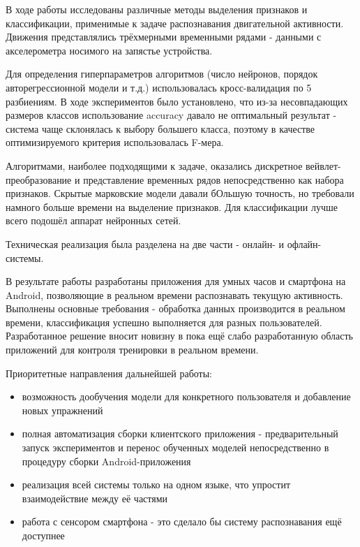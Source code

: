 \conclusion

В ходе работы исследованы различные методы выделения признаков и классификации, применимые к задаче распознавания двигательной активности. Движения представлялись трёхмерными временными рядами - данными с акселерометра носимого на запястье устройства.

Для определения гиперпараметров алгоритмов (число нейронов, порядок авторегрессионной модели и т.д.) использовалась кросс-валидация по 5 разбиениям. В ходе экспериментов было установлено, что из-за несовпадающих размеров классов использование accuracy давало не оптимальный результат - система чаще склонялась к выбору большего класса, поэтому в качестве оптимизируемого критерия использовалась F-мера.

Алгоритмами, наиболее подходящими к задаче, оказались дискретное вейвлет-преобразование и представление временных рядов непосредственно как набора признаков. Скрытые марковские модели давали бОльшую точность, но требовали намного больше времени на выделение признаков. Для классификации лучше всего подошёл аппарат нейронных сетей.


Техническая реализация была разделена на две части - онлайн- и офлайн-системы. 

В результате работы разработаны приложения для умных часов и смартфона на Android, позволяющие в реальном времени распознавать текущую активность. Выполнены основные требования - обработка данных производится в реальном времени, классификация успешно выполняется для разных пользователей. Разработанное решение вносит новизну в пока ещё слабо разработанную область приложений для контроля тренировки в реальном времени.

Приоритетные направления дальнейшей работы:

\begin{itemize}
\item возможность дообучения модели для конкретного пользователя и добавление новых упражнений
\item полная автоматизация сборки клиентского приложения - предварительный запуск экспериментов и перенос обученных моделей непосредственно в процедуру сборки Android-приложения
\item реализация всей системы только на одном языке, что упростит взаимодействие между её частями
\item работа с сенсором смартфона - это сделало бы систему распознавания ещё доступнее
\end{itemize}

